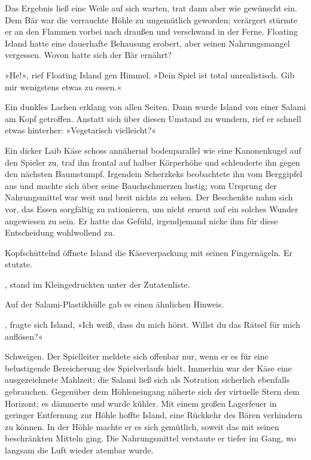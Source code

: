 Das Ergebnis ließ eine Weile auf sich warten, trat dann aber wie gewünscht ein. Dem Bär war die verrauchte Höhle zu ungemütlich geworden; verärgert stürmte er an den Flammen vorbei nach draußen und verschwand in der Ferne. Floating Island hatte eine dauerhafte Behausung erobert, aber seinen Nahrungsmangel vergessen. Wovon hatte sich der Bär ernährt?

»He!«, rief Floating Island gen Himmel. »Dein Spiel ist total unrealistisch. Gib mir wenigstens etwas zu essen.«

Ein dunkles Lachen erklang von allen Seiten. Dann wurde Island von einer Salami am Kopf getroffen. Anstatt sich über diesen Umstand zu wundern, rief er schnell etwas hinterher: »Vegetarisch vielleicht?«

Ein dicker Laib Käse schoss annähernd bodenparallel wie eine Kanonenkugel auf den Spieler zu, traf ihn frontal auf halber Körperhöhe und schleuderte ihn gegen den nächsten Baumstumpf. Irgendein Scherzkeks beobachtete ihn vom Berggipfel aus und machte sich über seine Bauchschmerzen lustig; vom Ursprung der Nahrungsmittel war weit und breit nichts zu sehen. Der Beschenkte nahm sich vor, das Essen sorgfältig zu rationieren, um nicht erneut auf ein solches Wunder angewiesen zu sein. Er hatte das Gefühl, irgendjemand nicke ihm für diese Entscheidung wohlwollend zu.

Kopfschüttelnd öffnete Island die Käseverpackung mit seinen Fingernägeln. Er stutzte.

, stand im Kleingedruckten unter der Zutatenliste. 

Auf der Salami-Plastikhülle gab es einen ähnlichen Hinweis. 

, fragte sich Island,  »Ich weiß, dass du mich hörst. Willst du das Rätsel für mich auflösen?«

Schweigen. Der Spielleiter meldete sich offenbar nur, wenn er es für eine belustigende Bereicherung des Spielverlaufs hielt. Immerhin war der Käse eine ausgezeichnete Mahlzeit; die Salami ließ sich als Notration sicherlich ebenfalls gebrauchen. Gegenüber dem Höhleneingang näherte sich der virtuelle Stern dem Horizont; es dämmerte und wurde kühler. Mit einem großen Lagerfeuer in geringer Entfernung zur Höhle hoffte Island, eine Rückkehr des Bären verhindern zu können. In der Höhle machte er es sich gemütlich, soweit das mit seinen beschränkten Mitteln ging. Die Nahrungsmittel verstaute er tiefer im Gang, wo langsam die Luft wieder atembar wurde.


